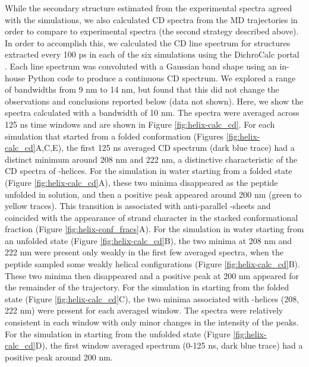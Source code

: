 While the secondary structure estimated from the experimental spectra agreed with the simulations, we also calculated CD spectra from the MD trajectories in order to compare to experimental spectra (the second strategy described above). 
In order to accomplish this, we calculated the CD line spectrum for structures extracted every 100 ps in each of the six simulations using the DichroCalc portal \cite{Bulheller2009, Jasim2018}. 
Each line spectrum was convoluted with a Gaussian band shape using an in-house Python code to produce a continuous CD spectrum. 
We explored a range of bandwidths from 9 nm to 14 nm, but found that this did not change the observations and conclusions reported below (data not shown). 
Here, we show the spectra calculated with a bandwidth of 10 nm. 
The spectra were averaged across 125 ns time windows and are shown in Figure \ref{fig:helix-calc_cd}. 
For each simulation that started from a folded conformation (Figures \ref{fig:helix-calc_cd}A,C,E), the first 125 ns averaged CD spectrum (dark blue trace) had a distinct minimum around 208 nm and 222 nm, a distinctive characteristic of the CD spectra of \textalpha{}-helices\cite{Holzwarth1965, Woody1967, Johnson1988, Berova2000circular, Kelly2005}.
For the simulation in water starting from a folded state (Figure \ref{fig:helix-calc_cd}A), these two minima disappeared as the peptide unfolded in solution, and then a positive peak appeared around 200 nm (green to yellow traces). 
This transition is associated with anti-parallel \textbeta{}-sheets\cite{Greenfield1969, Manning1988} and coincided with the appearance of strand character in the stacked conformational fraction (Figure \ref{fig:helix-conf_fracs}A). 
For the simulation in water starting from an unfolded state (Figure \ref{fig:helix-calc_cd}B), the two minima at 208 nm and 222 nm were present only weakly in the first few averaged spectra, when the peptide sampled some weakly helical configurations (Figure \ref{fig:helix-calc_cd}B). 
These two minima then disappeared and a positive peak at 200 nm appeared for the remainder of the trajectory. 
For the simulation in \tbawat{} starting from the folded state (Figure \ref{fig:helix-calc_cd}C), the two minima associated with \textalpha{}-helices (208, 222 nm) were present for each averaged window. 
The spectra were relatively consistent in each window with only minor changes in the intensity of the peaks. 
For the simulation in \tbawat{} starting from the unfolded state (Figure \ref{fig:helix-calc_cd}D), the first window averaged spectrum (0-125 ns, dark blue trace) had a positive peak around 200 nm. 
